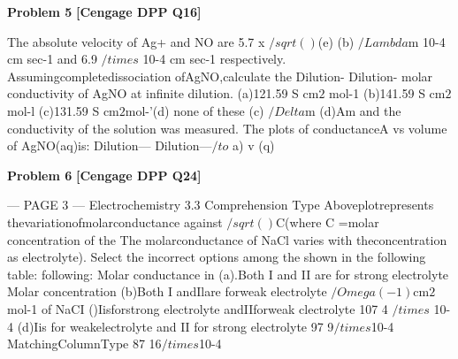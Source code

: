 \begin{problembox}
\textbf{Problem 5} \hfill \textbf{[Cengage DPP Q16]}
\label{q:ext-cng_dpp_all_questions-5}

The absolute velocity of Ag+ and NO are 5.7 x
$/sqrt()$(e)
(b) $/Lambda$m
10-4 cm sec-1 and 6.9 $/times$ 10-4 cm sec-1 respectively.
Assumingcompletedissociation ofAgNO,calculate the
Dilution-
Dilution-
molar conductivity of AgNO at infinite dilution.
(a)121.59 S cm$2$ mol-1
(b)141.59 S cm$2$mol-l
(c)131.59 S cm$2$mol-'(d) none of these
(c) $/Delta$m
(d)Am
and the conductivity of the solution was measured. The
plots of conductanceA vs volume of AgNO(aq)is:
Dilution---
Dilution---$/to$
a)
v (q)
\end{problembox}

\begin{problembox}
\textbf{Problem 6} \hfill \textbf{[Cengage DPP Q24]}
\label{q:ext-cng_dpp_all_questions-6}

--- PAGE 3 ---
Electrochemistry 3.3
Comprehension Type
Aboveplotrepresents thevariationofmolarconductance
against $/sqrt()$C(where C =molar concentration of the
The molarconductance of NaCl varies with theconcentration as
electrolyte). Select the incorrect options among the
shown in the following table:
following:
Molar conductance in
(a).Both I and II are for strong electrolyte
Molar concentration
(b)Both I andIlare forweak electrolyte
$/Omega(-1)$cm$2$mol-1
of NaCI
()Iisforstrong electrolyte andIIforweak clectrolyte
107
4 $/times$ 10-4
(d)Iis for weakelectrolyte and II for strong electrolyte
97
9$/times$10-4
MatchingColumnType
87
16$/times$10-4
\end{problembox}

